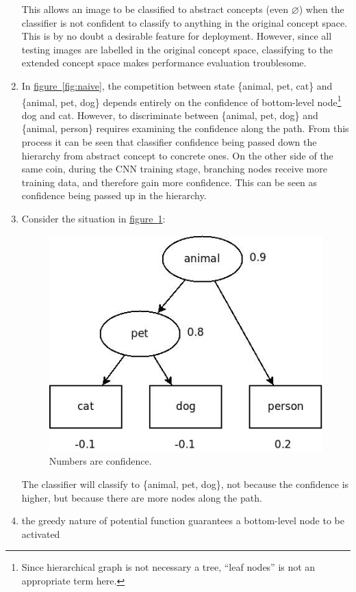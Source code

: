 \documentclass[11pt,a4paper]{article}
\begin{document}
\begin{enumerate}
This allows an image to be classified to abstract concepts (even $\varnothing$) when the classifier is not confident to classify to anything in the original concept space. This is by no doubt a desirable feature for deployment. However, since all testing images are labelled in the original concept space, classifying to the extended concept space makes performance evaluation troublesome.
\item In \hyperref[fig:naive]{figure~\ref{fig:naive}}, the competition between state \{animal, pet, cat\} and \{animal, pet, dog\} depends entirely on the confidence of bottom-level node\footnote{Since hierarchical graph is not necessary a tree, ``leaf nodes'' is not an appropriate term here.} dog and cat. However, to discriminate between \{animal, pet, dog\} and \{animal, person\} requires examining the confidence along the path. From this process it can be seen that classifier confidence being passed down the hierarchy from abstract concept to concrete ones. On the other side of the same coin, during the CNN training stage, branching nodes receive more training data, and therefore gain more confidence. This can be seen as confidence being passed up in the hierarchy.
\item Consider the situation in \hyperref[fig:depth]{figure~\ref{fig:depth}}:
\begin{figure}[h]
\centering
\includegraphics[scale=0.5]{depth.jpeg}
\caption{Numbers are confidence.}
\label{fig:depth}
\end{figure}

The classifier will classify to \{animal, pet, dog\}, not because the confidence is higher, but because there are more nodes along the path.

\item the greedy nature of potential function guarantees a bottom-level node to be activated
\end{enumerate}
\end{document}

